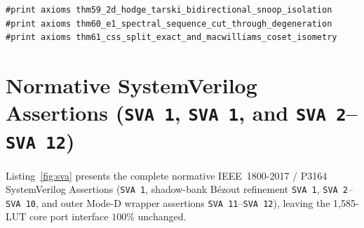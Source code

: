 \documentclass[11pt,letterpaper]{article}
\providecommand{\CoreClbLuts}{1,585}
\providecommand{\CorePhysicalLUTs}{\CoreClbLuts}
\theoremstyle{spectralthm}
\begin{document}
\begin{lstlisting}[language=Lean4,caption={Standalone Pure Init.Prelude Term-Mode Lean 4 Kernel Suite (thm30--thm61, v0.0.0, 0 sorry, 0 axioms).},label={lst:lean_unified}]
#print axioms thm59_2d_hodge_tarski_bidirectional_snoop_isolation
#print axioms thm60_e1_spectral_sequence_cut_through_degeneration
#print axioms thm61_css_split_exact_and_macwilliams_coset_isometry
\end{lstlisting}

\section{Normative SystemVerilog Assertions (\texorpdfstring{\texttt{SVA 1}}{SVA 1}, \texorpdfstring{\texttt{SVA~1\textquotesingle}}{SVA 1'}, and \texorpdfstring{\texttt{SVA 2}--\texttt{SVA 12}}{SVA 2--SVA 12})}
\label{app:sva}

Listing~\ref{fig:sva} presents the complete normative IEEE~1800-2017 / P3164 SystemVerilog Assertions (\texttt{SVA 1}, shadow-bank B\'{e}zout refinement \texttt{SVA~1\textquotesingle}, \texttt{SVA 2}--\texttt{SVA 10}, and outer Mode-D wrapper assertions \texttt{SVA 11}--\texttt{SVA 12}), leaving the \CorePhysicalLUTs-LUT core port interface $100\%$ unchanged.
\end{document}
